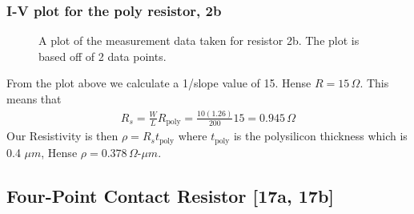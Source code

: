 \documentclass{article}
\begin{document}
\subsubsection{I-V plot for the poly resistor, 2b}
\begin{figure}[H]
\centering
{}
\caption{A plot of the measurement data taken for resistor 2b. The plot is based off of 2 data points.}
\end{figure}

From the plot above we calculate a 1/slope value of 15. Hense $R = 15 \,\Omega$. This means that 
\begin{align*}
R_s = \frac{W}{L}R_{\text{poly}} = \frac{10(1.26)}{200}15 = 0.945 \,\Omega 
\end{align*}
Our Resistivity is then $\rho = R_s t_{\text{poly}}$ where $t_{\text{poly}}$ is the polysilicon thickness which is 0.4 $\mu m$, Hense $\rho = 0.378 \,\Omega$-$\mu m$.

\subsection{Four-Point Contact Resistor [17a, 17b]} %
\end{document}
